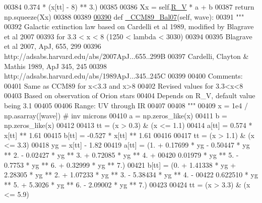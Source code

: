 \begin{DoxyCode}
00384                  0.374 * (x[tt] - 8) ** 3.)
00385         
00386         Xx = self.\hyperlink{classpyneb_1_1extinction_1_1red__corr_1_1_red_corr_a4696ecdd84c912c20e6aa19b1573e875}{R\_V} * a + b
00387         \textcolor{keywordflow}{return} np.squeeze(Xx)
00388 
00389 
\hypertarget{red__corr_8py_source_l00390}{}\hyperlink{classpyneb_1_1extinction_1_1red__corr_1_1_red_corr_a919503a9ebc8aafcf92ea819bcc3265c}{00390}     \textcolor{keyword}{def }\hyperlink{classpyneb_1_1extinction_1_1red__corr_1_1_red_corr_a919503a9ebc8aafcf92ea819bcc3265c}{\_CCM89\_Bal07}(self, wave):
00391         \textcolor{stringliteral}{"""}
00392 \textcolor{stringliteral}{        Galactic extinction law based on Cardelli et al 1989, modified by Blagrave et al 2007 }
00393 \textcolor{stringliteral}{        for 3.3 < x < 8 (1250 < lambda < 3030)}
00394 \textcolor{stringliteral}{        }
00395 \textcolor{stringliteral}{        Blagrave et al 2007, ApJ, 655, 299 }
00396 \textcolor{stringliteral}{        http://adsabs.harvard.edu/abs/2007ApJ...655..299B}
00397 \textcolor{stringliteral}{        Cardelli, Clayton & Mathis 1989, ApJ 345, 245}
00398 \textcolor{stringliteral}{        http://adsabs.harvard.edu/abs/1989ApJ...345..245C}
00399 \textcolor{stringliteral}{}
00400 \textcolor{stringliteral}{        Comments:}
00401 \textcolor{stringliteral}{        Same as CCM89 for x<3.3 and x>8}
00402 \textcolor{stringliteral}{        Revised values for 3.3<x<8}
00403 \textcolor{stringliteral}{        Based on observation of Orion stars}
00404 \textcolor{stringliteral}{        Depends on R\_V, default value being 3.1}
00405 \textcolor{stringliteral}{}
00406 \textcolor{stringliteral}{        Range: UV through IR}
00407 \textcolor{stringliteral}{        }
00408 \textcolor{stringliteral}{        """}
00409         x = 1e4 / np.asarray([wave]) \textcolor{comment}{# inv microns}
00410         a = np.zeros\_like(x)
00411         b = np.zeros\_like(x)
00412         
00413         tt = (x > 0.3) & (x <= 1.1)
00414         a[tt] = 0.574 * x[tt] ** 1.61 
00415         b[tt] = -0.527 * x[tt] ** 1.61
00416     
00417         tt = (x > 1.1) & (x <= 3.3)
00418         yg = x[tt] - 1.82
00419         a[tt] = (1. + 0.17699 * yg - 0.50447 * yg ** 2. - 0.02427 * yg ** 3. + 0.72085 * yg ** 4. + 
00420                  0.01979 * yg ** 5. - 0.7753 * yg ** 6. + 0.32999 * yg ** 7.)
00421         b[tt] = (0. + 1.41338 * yg + 2.28305 * yg ** 2. + 1.07233 * yg ** 3. - 5.38434 * yg ** 4. - 
00422                  0.622510 * yg ** 5. + 5.3026 * yg ** 6. - 2.09002 * yg ** 7.)
00423         
00424         tt = (x > 3.3) & (x <= 5.9)

\end{DoxyCode}
